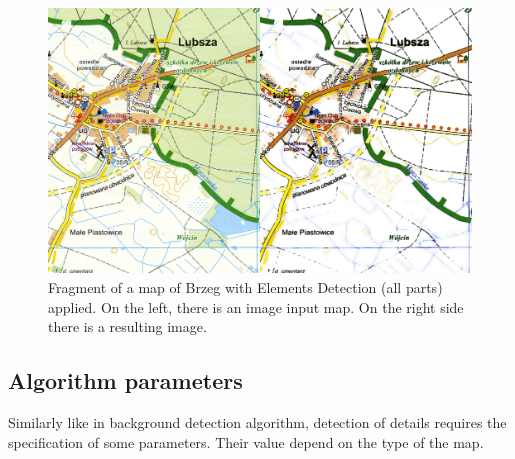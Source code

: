 \documentclass[a4paper,onecolumn,oneside,12pt]{memoir}
\begin{document}
\begin{figure}[!ht]
\begin{center}
\includegraphics[scale=1.2]{images/lineDetectionResult.png}
\caption{Fragment of a map of Brzeg with Elements Detection (all parts) applied.
On the left, there is an image input map. On the right side there is a resulting image.}
\label{lineDetectionResult}
\end{center}
\end{figure}

\subsection{Algorithm parameters}
\label{lineDetectionParamsSection}

Similarly like in background detection algorithm, detection of details requires the specification of
some parameters. Their value depend on the type of the map.
\end{document}
